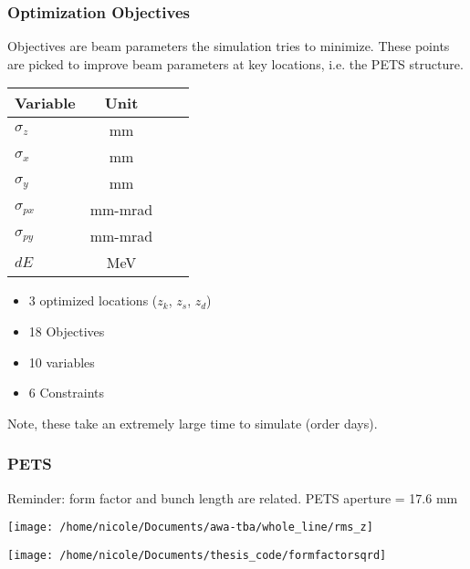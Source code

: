 \documentclass[professionalfonts,t]{beamer}
\begin{document}
\begin{frame}
\frametitle{Optimization Objectives}
Objectives are beam parameters the simulation tries to minimize.
These points are picked to improve beam parameters at key locations, 
i.e. the PETS structure.

\vspace{1em}
\begin{minipage}{0.45\textwidth}
	\begin{table}[hbt] 
		\centering
		\begin{tabular}{ l *{3}{c}}
			\toprule
			\textbf{Variable} &  \textbf{Unit} \\
			\midrule
			$\sigma_z$ 		& mm \\
			$\sigma_{x}$ 	& mm \\
			$\sigma_y$ 		& mm \\
			$\sigma_{px}$ 	& mm-mrad \\
			$\sigma_{py}$ 	& mm-mrad \\
			$dE$			& MeV\\
			\bottomrule	
		\end{tabular}	
	\end{table}
\end{minipage}
\begin{minipage}{0.45\textwidth}
	\begin{itemize}
		\item 3 optimized locations ($z_k$, $z_s$, $z_d$)
		\item 18 Objectives
		\item 10 variables 
		\item 6 Constraints
	\end{itemize}
\end{minipage}
\centering
Note, these take an extremely large time to simulate (order days).
\end{frame}








\begin{frame}
\frametitle{PETS}
Reminder: form factor and bunch length are related. PETS aperture = 17.6 mm

\begin{minipage}{0.49\textwidth}
\texttt{[image: /home/nicole/Documents/awa-tba/whole\_line/rms\_z]}
\end{minipage}
\begin{minipage}{0.49\textwidth}

\centering
\texttt{[image: /home/nicole/Documents/thesis\_code/formfactorsqrd]}
\end{minipage}
\end{frame}
\end{document}
